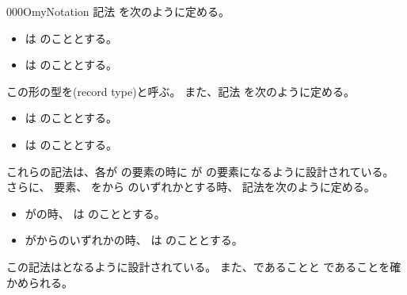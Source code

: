 \documentclass[index]{subfiles}
\begin{document}
\begin{myBlock}{000O}{myNotation}
  記法
  を次のように定める。
  \begin{itemize}
  \item \myInlineMath{\myRecordType{}}は
    \myInlineMath{\myUnitType}のこととする。
  \item {}は
    のこととする。
  \end{itemize}
  この形の型を(record type)と呼ぶ。
  また、記法
  を次のように定める。
  \begin{itemize}
  \item \myInlineMath{\myRecordElem{}}は
    \myInlineMath{\myUnitElem}のこととする。
  \item {}は
    のこととする。
  \end{itemize}
  これらの記法は、各が
  の要素の時に
  が
  の要素になるように設計されている。
  さらに、
  要素、
  をから
  のいずれかとする時、
  記法を次のように定める。
  \begin{itemize}
  \item {}がの時、
    は
    のこととする。
  \item {}がからのいずれかの時、
    は
    のこととする。
  \end{itemize}
  この記法はとなるように設計されている。
  また、であることと
  であることを確かめられる。
\end{myBlock}
\end{document}
